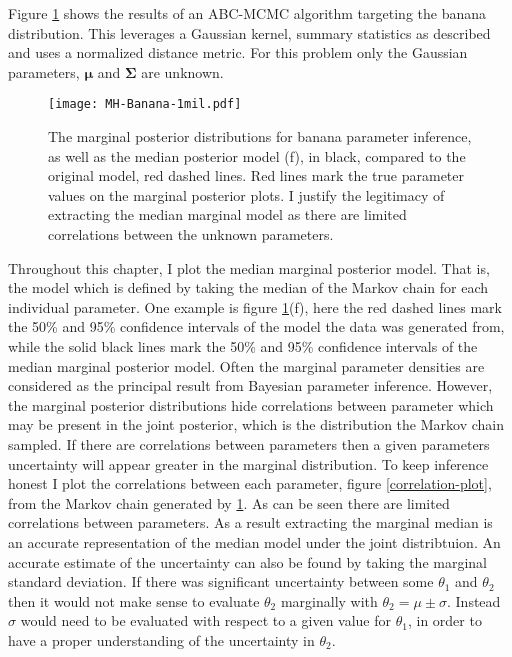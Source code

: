 Figure \ref{MH-banana} shows the results of an ABC-MCMC algorithm targeting the banana distribution. This leverages a Gaussian kernel, summary statistics as described and uses a normalized distance metric. For this problem only the Gaussian parameters, $\bm{\mu}$ and $\bm{\Sigma}$ are unknown.\\

\begin{figure}[H]
	\centering
	\texttt{[image: MH-Banana-1mil.pdf]}
	\caption{The marginal posterior distributions for banana parameter inference, as well as the median posterior model (f), in black, compared to the original model, red dashed lines. Red lines mark the true parameter values on the marginal posterior plots. I justify the legitimacy of extracting the median marginal model as there are limited correlations between the unknown parameters.}
	\label{MH-banana}
\end{figure}

Throughout this chapter, I plot the median marginal posterior model. That is, the model which is defined by taking the median of the Markov chain for each individual parameter. One example is figure \ref{MH-banana}(f), here the red dashed lines mark the 50\% and 95\% confidence intervals of the model the data was generated from, while the solid black lines mark the 50\% and 95\% confidence intervals of the median marginal posterior model. Often the marginal parameter densities are considered as the principal result from Bayesian parameter inference. However, the marginal posterior distributions hide correlations between parameter which may be present in the joint posterior, which is the distribution the Markov chain sampled. If there are correlations between parameters then a given parameters uncertainty will appear greater in the marginal distribution. To keep inference honest I plot the correlations between each parameter, figure \ref{correlation-plot}, from the Markov chain generated by \ref{MH-banana}. As can be seen there are limited correlations between parameters. As a result extracting the marginal median is an accurate representation of the median model under the joint distribtuion. An accurate estimate of the uncertainty can also be found by taking the marginal standard deviation. If there was significant uncertainty between some $\theta_1$ and $\theta_2$ then it would not make sense to evaluate $\theta_2$ marginally with $\theta_2 = \mu \pm \sigma$. Instead $\sigma$ would need to be evaluated with respect to a given value for $\theta_1$, in order to have a proper understanding of the uncertainty in $\theta_2$. 

